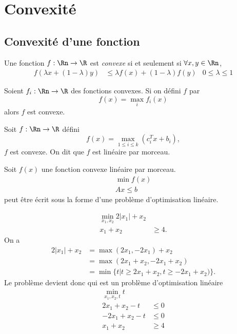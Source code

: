 \section{Convexité}
\subsection{Convexité d'une fonction}
\begin{mydef}
  Une fonction $f: \Rn \to \R$ est \emph{convexe} si et seulement si
  $\forall x, y \in \Rn$,
  \begin{align*}
    f(\lambda x + (1-\lambda)y) & \leq
    \lambda f(x) + (1-\lambda)f(y) & 0 \leq \lambda \leq 1
  \end{align*}
\end{mydef}
\begin{myprop}
  Soient $f_i: \Rn \to \R$ des fonctions convexes.
  Si on défini $f$ par
  \[ f(x) = \max_i f_i(x) \]
  alors $f$ est convexe.
\end{myprop}
\begin{myprop}
  Soit $f: \Rn \to \R$ défini
  \[ f(x) = \max_{1 \leq i \leq k}(c_i^Tx + b_i), \]
  $f$ est convexe.
  On dit que $f$ est linéaire par morceau.
\end{myprop}
\begin{myprop}
  Soit $f(x)$ une fonction convexe linéaire par morceau.
  \begin{align*}
    \min f(x)\\
    Ax \leq b
  \end{align*}
  peut être écrit sous la forme d'une problème d'optimisation linéaire.
\end{myprop}
\begin{myexem}
  \begin{align*}
    \min_{x_1,x_2} 2|x_1| + x_2\\
    x_1 + x_2 & \geq 4.
  \end{align*}
  On a
  \begin{align*}
    2|x_1|+x_2 & = \max(2x_1,-2x_1) + x_2\\
    & = \max(2x_1+x_2,-2x_1+x_2)\\
    & = \min\{t|t\geq 2x_1+x_2,t\geq -2x_1+x_2)\}.
  \end{align*}
  Le problème devient donc
  qui est un problème d'optimisation linéaire
  \begin{align*}
    \min_{x_1, x_2, t} t\\
    2x_1 + x_2 - t & \leq 0\\
    -2x_1 + x_2 - t & \leq 0\\
    x_1 + x_2 & \geq 4
  \end{align*}
\end{myexem}
